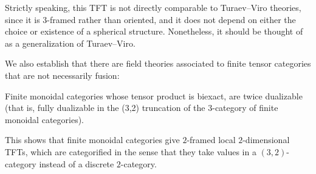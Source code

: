 \documentclass{amsart}
\begin{document}
\nid Strictly speaking, this TFT is not directly comparable to Turaev--Viro theories, since it is $3$-framed rather than oriented, and it does not depend on either the choice or existence of a spherical structure.  Nonetheless, it should be thought of as a generalization of Turaev--Viro.


We also establish that there are field theories associated to finite tensor categories that are not necessarily fusion:

\begin{theorem}
Finite monoidal categories whose tensor product is biexact, are twice dualizable (that is, fully dualizable in the (3,2) truncation of the $3$-category of finite monoidal categories). 
\end{theorem}

This shows that finite monoidal categories give $2$-framed local $2$-dimensional TFTs, which are categorified in the sense that they take values in a $(3,2)$-category instead of a discrete $2$-category.  
\end{document}
